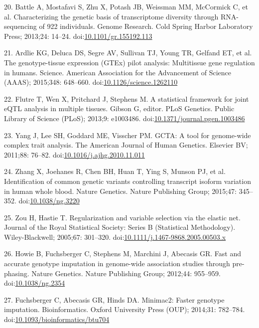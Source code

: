 \documentclass[]{article}
\begin{document}
20. Battle A, Mostafavi S, Zhu X, Potash JB, Weissman MM, McCormick C,
et al. Characterizing the genetic basis of transcriptome diversity
through RNA-sequencing of 922 individuals. Genome Research. Cold Spring
Harbor Laboratory Press; 2013;24: 14--24.
doi:\href{http://dx.doi.org/10.1101/gr.155192.113}{10.1101/gr.155192.113}

21. Ardlie KG, Deluca DS, Segre AV, Sullivan TJ, Young TR, Gelfand ET,
et al. The genotype-tissue expression (GTEx) pilot analysis: Multitissue
gene regulation in humans. Science. American Association for the
Advancement of Science (AAAS); 2015;348: 648--660.
doi:\href{http://dx.doi.org/10.1126/science.1262110}{10.1126/science.1262110}

22. Flutre T, Wen X, Pritchard J, Stephens M. A statistical framework
for joint eQTL analysis in multiple tissues. Gibson G, editor. PLoS
Genetics. Public Library of Science (PLoS); 2013;9: e1003486.
doi:\href{http://dx.doi.org/10.1371/journal.pgen.1003486}{10.1371/journal.pgen.1003486}

23. Yang J, Lee SH, Goddard ME, Visscher PM. GCTA: A tool for
genome-wide complex trait analysis. The American Journal of Human
Genetics. Elsevier BV; 2011;88: 76--82.
doi:\href{http://dx.doi.org/10.1016/j.ajhg.2010.11.011}{10.1016/j.ajhg.2010.11.011}

24. Zhang X, Joehanes R, Chen BH, Huan T, Ying S, Munson PJ, et al.
Identification of common genetic variants controlling transcript isoform
variation in human whole blood. Nature Genetics. Nature Publishing
Group; 2015;47: 345--352.
doi:\href{http://dx.doi.org/10.1038/ng.3220}{10.1038/ng.3220}

25. Zou H, Hastie T. Regularization and variable selection via the
elastic net. Journal of the Royal Statistical Society: Series B
(Statistical Methodology). Wiley-Blackwell; 2005;67: 301--320.
doi:\href{http://dx.doi.org/10.1111/j.1467-9868.2005.00503.x}{10.1111/j.1467-9868.2005.00503.x}

26. Howie B, Fuchsberger C, Stephens M, Marchini J, Abecasis GR. Fast
and accurate genotype imputation in genome-wide association studies
through pre-phasing. Nature Genetics. Nature Publishing Group; 2012;44:
955--959. doi:\href{http://dx.doi.org/10.1038/ng.2354}{10.1038/ng.2354}

27. Fuchsberger C, Abecasis GR, Hinds DA. Minimac2: Faster genotype
imputation. Bioinformatics. Oxford University Press (OUP); 2014;31:
782--784.
doi:\href{http://dx.doi.org/10.1093/bioinformatics/btu704}{10.1093/bioinformatics/btu704}
\end{document}
